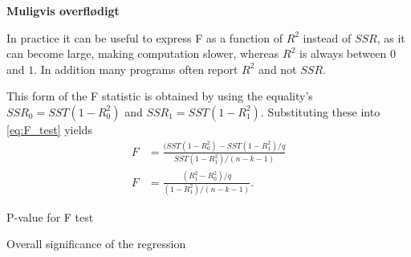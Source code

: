 \textbf{Muligvis overflødigt}

In practice it can be useful to express F as a function of $R^2$ instead of $SSR$, as it can become large, making computation slower, whereas $R^2$ is always between $0$ and $1$. In addition many programs often report $R^2$ and not $SSR$.

This form of the F statistic is obtained by using the equality's $SSR_0 = SST(1 - R^2_0)$ and $SSR_1 = SST(1-R^2_1)$. Substituting these into \eqref{eq:F_test} yields
\begin{align}\label{eq:F_test_R}
    F &= \frac{(SST(1 - R^2_0) - SST(1-R^2_1)/q}{SST(1-R^2_1)/(n-k-1)} \nonumber \\
    F &= \frac{(R^2_1 - R^2_0)/q}{(1 - R^2_1)/(n-k-1)}.
\end{align}



P-value for F test

Overall significance of the regression







